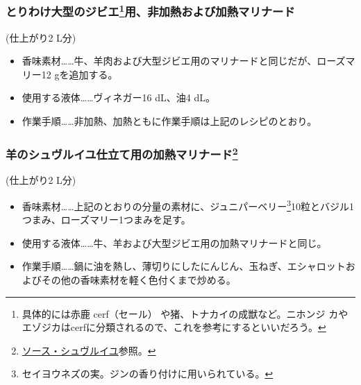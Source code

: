 \begin{recette}
\hypertarget{marinade-crue-ou-cuite-pour-grosse-venaison}{%
\subsubsection[とりわけ大型のジビエ用、非加熱および加熱マリナード]{\texorpdfstring{とりわけ大型のジビエ\footnote{具体的には赤鹿
  cerf（セール） や猪、トナカイの成獣など。ニホンジ
  カやエゾジカはcerfに分類されるので、これを参考にするといいだろう。}用、非加熱および加熱マリナード}{とりわけ大型のジビエ用、非加熱および加熱マリナード}}\label{marinade-crue-ou-cuite-pour-grosse-venaison}}



(仕上がり2 L分)

\begin{itemize}
\item
  香味素材\ldots{}\ldots{}牛、羊肉および大型ジビエ用のマリナードと同じだが、ローズマリー12
  gを追加する。
\item
  使用する液体\ldots{}\ldots{}ヴィネガー16 dL、油4 dL。
\item
  作業手順\ldots{}\ldots{}非加熱、加熱ともに作業手順は上記のレシピのとおり。
\end{itemize}

\hypertarget{marinade-cuite-pour-le-mouton-en-chevreuil}{%
\subsubsection[羊のシュヴルイユ仕立て用の加熱マリナード]{\texorpdfstring{羊のシュヴルイユ仕立て用の加熱マリナード\footnote{\protect\hyperlink{sauce-chevreuil}{ソース・シュヴルイユ}参照。}}{羊のシュヴルイユ仕立て用の加熱マリナード}}\label{marinade-cuite-pour-le-mouton-en-chevreuil}}



(仕上がり2 L分)

\begin{itemize}
\item
  香味素材\ldots{}\ldots{}上記のとおりの分量の素材に、ジュニパーベリー\footnote{セイヨウネズの実。ジンの香り付けに用いられている。}10粒とバジル1つまみ、ローズマリー1つまみを足す。
\item
  使用する液体\ldots{}\ldots{}牛、羊および大型ジビエ用の加熱マリナードと同じ。
\item
  作業手順\ldots{}\ldots{}鍋に油を熱し、薄切りにしたにんじん、玉ねぎ、エシャロットおよびその他の香味素材を軽く色付くまで炒める。


\end{itemize}
\end{recette}
